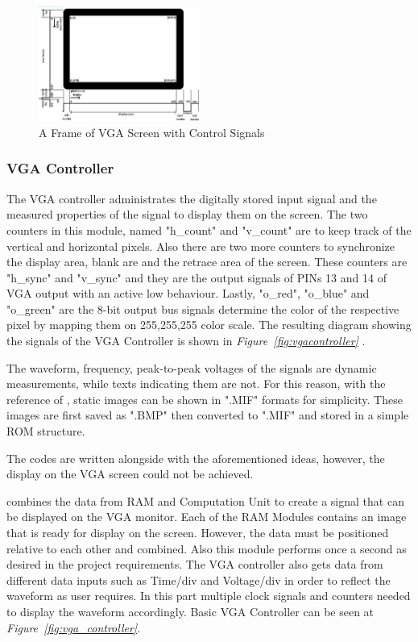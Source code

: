 \documentclass[paper]{IEEEtran}
\begin{document}
	\begin{figure}[h!]
		\setlength{\unitlength}{\textwidth}
		\center 
		\includegraphics[width=0.47\textwidth]{vga-hsync-vsync}
		\caption{\label{fig:vga-hsync-vsync}A Frame of VGA Screen with Control Signals}
	\end{figure}
	
	\subsubsection{VGA Controller} \- \indent
	
	The VGA controller administrates the digitally stored input signal and the measured properties of the signal to display them on the screen. The two counters in this module, named "h\_count" and "v\_count" are to keep track of the vertical and horizontal pixels. Also there are two more counters to synchronize the display area, blank are and the retrace area of the screen. These counters are "h\_sync" and "v\_sync" and they are the output signals of PINs 13 and 14 of VGA output with an active low behaviour. Lastly, "o\_red", "o\_blue" and "o\_green" are the 8-bit output bus signals determine the color of the respective pixel by mapping them on 255,255,255 color scale. The resulting diagram showing the signals of the VGA Controller is shown in  \textit{Figure~\ref{fig:vgacontroller}} \cite{b4}.
	
	The waveform, frequency, peak-to-peak voltages of the signals are dynamic measurements, while texts indicating them are not. For this reason, with the reference of \cite{b2}, static images can be shown in ".MIF" formats for simplicity. These images are first saved as ".BMP" then converted to ".MIF" and stored in a simple ROM structure.
	
	The codes are written alongside with the aforementioned ideas, however, the display on the VGA screen could not be achieved. 
	
	combines the data from RAM and Computation Unit to create a signal that can be displayed on the VGA monitor. Each of the RAM Modules contains an image that is ready for display on the screen. However, the data must be positioned relative to each other and combined. Also this module performs once a second as desired in the project requirements. The VGA controller also gets data from different data inputs such as Time/div and Voltage/div in order to reflect the waveform as user requires. In this part multiple clock signals and counters needed to display the waveform accordingly. Basic VGA Controller can be seen at \textit{Figure~\ref{fig:vga_controller}}.
	
\end{document}
